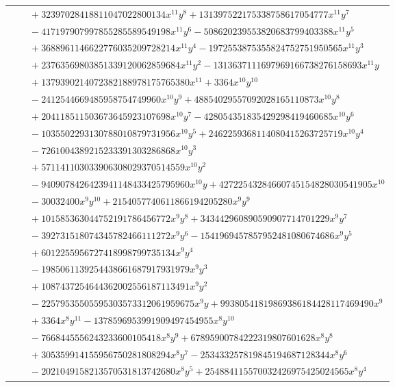 \documentclass[11pt]{article}
\begin{document}
\begin{longtable}{@{}ll@{}}
 & $\quad +32397028418811047022800134x^{11}y^{8}+131397522175338758617054777x^{11}y^{7}$\\
 & $\quad -417197907997855285589549198x^{11}y^{6}-508620239553820683799403388x^{11}y^{5}$\\
 & $\quad +3688961146622776035209728214x^{11}y^{4}-1972553875355824752751950565x^{11}y^{3}$\\
 & $\quad +23763569803851339120062859684x^{11}y^{2}-1313637111697969166738276158693x^{11}y$\\
 & $\quad +1379390214072382188978175765380x^{11}+3364x^{10}y^{10}$\\
 & $\quad -2412544669485958754749960x^{10}y^{9}+48854029557092028165110873x^{10}y^{8}$\\
 & $\quad +204118511503673645923107698x^{10}y^{7}-428054351835429298419460685x^{10}y^{6}$\\
 & $\quad -1035502293130788010879731956x^{10}y^{5}+2462259368114080415263725719x^{10}y^{4}$\\
 & $\quad -7261004389215233391303286868x^{10}y^{3}$\\
 & $\quad +571141103033906308029370514559x^{10}y^{2}$\\
 & $\quad -9409078426423941148433425795960x^{10}y+42722543284660745154828030541905x^{10}$\\
 & $\quad -30032400x^{9}y^{10}+2154057740611866194205280x^{9}y^{9}$\\
 & $\quad +101585363044752191786456772x^{9}y^{8}+343442960890590907714701229x^{9}y^{7}$\\
 & $\quad -392731518074345782466111272x^{9}y^{6}-1541969457857952481080674686x^{9}y^{5}$\\
 & $\quad +6012255956727418998799735134x^{9}y^{4}$\\
 & $\quad -1985061139254438661687917931979x^{9}y^{3}$\\
 & $\quad +1087437254644362002556187113491x^{9}y^{2}$\\
 & $\quad -22579535505595303573312061959675x^{9}y+99380541819869386184428117469490x^{9}$\\
 & $\quad +3364x^{8}y^{11}-1378596953991909497454955x^{8}y^{10}$\\
 & $\quad -7668445556243233600105418x^{8}y^{9}+67895900784222319807601628x^{8}y^{8}$\\
 & $\quad +305359914155956750281808294x^{8}y^{7}-253433257819845194687128344x^{8}y^{6}$\\
 & $\quad -2021049158213570531813742680x^{8}y^{5}+254884115570032426975425024565x^{8}y^{4}$\\

\end{longtable}
\end{document}
